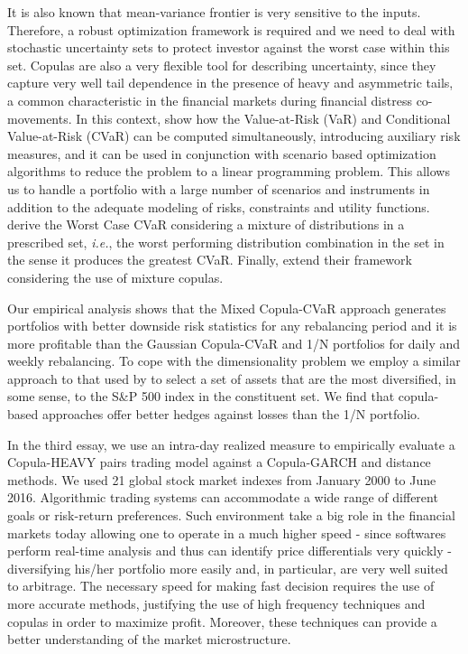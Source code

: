 \documentclass[a4paper,12pt]{report}
\begin{document}
\begin{refsection}
	It is also known that mean-variance frontier is very sensitive to the inputs. Therefore, a robust optimization framework is required and we need to deal with stochastic uncertainty sets to protect investor against the worst case within this set. Copulas are also a very flexible tool for describing uncertainty, since they capture very well tail dependence in the presence of heavy and asymmetric tails, a common characteristic in the financial markets during financial distress co-movements. In this context, \citet*{rockafellar2000} show how the Value-at-Risk (VaR) and Conditional Value-at-Risk (CVaR) can be computed simultaneously, introducing auxiliary risk measures, and it can be used in conjunction with scenario based optimization algorithms to reduce the problem to a linear programming problem. This allows us to handle a portfolio with a large number of scenarios and instruments in addition to the adequate modeling of risks, constraints and utility functions. \citet*{zhu2009worst} derive the Worst Case CVaR considering a mixture of distributions in a prescribed set, \emph{i.e.}, the worst performing distribution combination in the set in the sense it produces the greatest CVaR. Finally, \citet*{kakouris14} extend their framework considering the use of mixture copulas.
	
	Our empirical analysis shows that the Mixed Copula-CVaR
	approach generates portfolios with better downside risk statistics for any rebalancing period and it is more profitable than the Gaussian Copula-CVaR and 1/N portfolios for daily and weekly rebalancing. To cope with the dimensionality problem we employ a similar approach to that used by \citet*{ggr06} to select a set of assets that are the most
	diversified, in some sense, to the S\&P 500 index in the constituent set. We find that copula-based approaches offer better hedges against losses than the 1/N portfolio. 
	
	
	In the third essay, we use an intra-day realized measure to empirically evaluate a Copula-HEAVY pairs trading model against a Copula-GARCH and distance methods. We used 21 global stock market indexes from January 2000 to June 2016. Algorithmic trading systems can accommodate a wide range of different goals or risk-return preferences. Such environment take a big role in the financial markets today allowing one to operate in a much higher speed - since softwares perform real-time analysis and thus can identify price differentials very quickly - diversifying his/her portfolio more easily and, in particular, are very well suited to arbitrage. The necessary speed for making fast decision requires the use of more accurate methods, justifying the use of high frequency techniques and copulas in order to maximize profit. Moreover, these techniques can provide a better understanding of the market microstructure.
	


\end{refsection}
\end{document}
